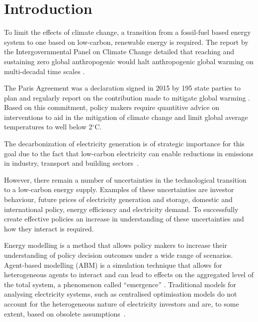 \documentclass[final,3p,times,twocolumn,numbers]{elsarticle}
\begin{document}

\section{Introduction}
\label{sec:intro}


To limit the effects of climate change, a transition from a fossil-fuel based energy system to one based on low-carbon, renewable energy is required. The report by the Intergovernmental Panel on Climate Change detailed that reaching and sustaining zero global anthropogenic  would halt anthropogenic global warming on multi-decadal time scales \cite{Masson-Delmotte2018}. 

The Paris Agreement was a declaration signed in 2015 by 195 state parties to plan and regularly report on the contribution made to mitigate global warming \cite{May2002}. Based on this commitment, policy makers require quantitive advice on interventions to aid in the mitigation of climate change and limit global average temperatures to well below 2$^{\circ}$C. 

The decarbonization of electricity generation is of strategic importance for this goal due to the fact that low-carbon electricity can enable reductions in  emissions in industry, transport and building sectors~\cite{Salas2017}. 

However, there remain a number of uncertainties in the technological transition to a low-carbon energy supply. Examples of these uncertainties are investor behaviour, future prices of electricity generation and storage, domestic and international policy, energy efficiency and electricity demand. To successfully create effective policies an increase in understanding of these uncertainties and how they interact is required.

Energy modelling is a method that allows policy makers to increase their understanding of policy decision outcomes under a wide range of scenarios. Agent-based modelling (ABM) is a simulation technique that allows for heterogeneous agents to interact and can lead to effects on the aggregated level of the total system, a phenomenon called ``emergence'' \cite{EpsteinJoshuaM.author.GSSS}. Traditional models for analysing electricity systems, such as centralised optimisation models do not account for the heterogeneous nature of electricity investors and are, to some extent, based on obsolete assumptions~\cite{Ringler2016}.
\end{document}
